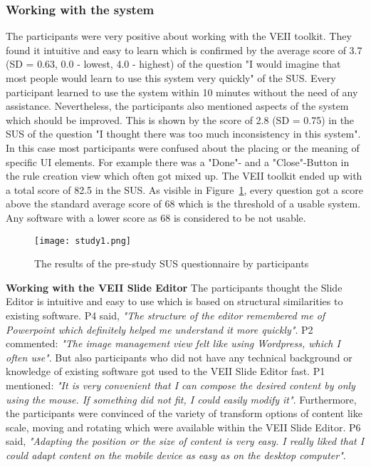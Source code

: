 \subsubsection{Working with the system}
The participants were very positive about working with the VEII toolkit. They found it intuitive and easy to learn which is confirmed by the average score of 3.7 (SD = 0.63, 0.0 - lowest, 4.0 - highest) of the question "I would imagine that most people would learn to use this system very quickly" of the SUS. Every participant learned to use the system within 10 minutes without the need of any assistance. Nevertheless, the participants also mentioned aspects of the system which should be improved. This is shown by the score of 2.8 (SD = 0.75) in the SUS of the question "I thought there was too much inconsistency in this system". In this case most participants were confused about the placing or the meaning of specific UI elements. For example there was a "Done"- and a "Close"-Button in the rule creation view which often got mixed up. The VEII toolkit ended up with a total score of 82.5 in the SUS. As visible in Figure~\ref{fig:prestudyresult1}, every question got a score above the standard average score of 68 which is the threshold of a usable system. Any software with a lower score as 68 is considered to be not usable.
\newline

\begin{figure}
  \begin{center}
    \texttt{[image: study1.png]}
    \caption{The results of the pre-study SUS questionnaire by participants}
    \label{fig:prestudyresult1}
  \end{center}
\end{figure}

\textbf{Working with the VEII Slide Editor}
\newline
The participants thought the Slide Editor is intuitive and easy to use which is based on structural similarities to existing software. P4 said, \textit{"The structure of the editor remembered me of Powerpoint which definitely helped me understand it more quickly"}. P2 commented: \textit{"The image management view felt like using Wordpress, which I often use"}. But also participants who did not have any technical background or knowledge of existing software got used to the VEII Slide Editor fast. P1 mentioned: \textit{"It is very convenient that I can compose the desired content by only using the mouse. If something did not fit, I could easily modify it"}. Furthermore, the participants were convinced of the variety of transform options of content like scale, moving and rotating which were available within the VEII Slide Editor. P6 said, \textit{"Adapting the position or the size of content is very easy. I really liked that I could adapt content on the mobile device as easy as on the desktop computer"}.
\newline

